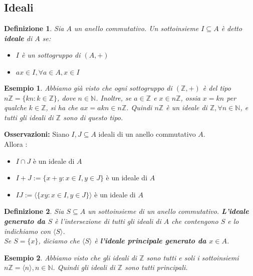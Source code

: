 \documentclass[a4paper,12pt]{article}
\theoremstyle{def}
\newtheorem*{definition}{Definizione}
\theoremstyle{prop}
\theoremstyle{esempio}
\newtheorem*{example}{Esempio}
\theoremstyle{dimostrazione}
\theoremstyle{teo}
\theoremstyle{osservazione}
\begin{document}
\subsection{Ideali}

\begin{definition}
    Sia \(A\) un anello commutativo. Un sottoinsieme \(I \subseteq A\) è detto \textbf{ideale} di \(A\) se:
    \
    \begin{itemize}
        \item \(I\) è un sottogruppo di \((A,+)\)
        \item \(ax \in I, \forall a \in A, x \in I\)
    \end{itemize}
\end{definition}

\begin{example}
    Abbiamo già visto che ogni sottogruppo di \((\mathbb{Z} , +)\) è del tipo \(n \mathbb{Z} = \{kn : k \in \mathbb{Z} \}\),
    dove \(n \in \mathbb{N} \). Inoltre, se \(a \in \mathbb{Z} \) e \(x \in n\mathbb{Z} \), ossia
    \(x=kn\) per qualche \(k \in \mathbb{Z} \), si ha che \(ax=akn \in n \mathbb{Z} \).
    Quindi \(n \mathbb{Z} \) è un ideale di \(\mathbb{Z}, \forall n \in \mathbb{N}  \), e tutti gli ideali di
    \(\mathbb{Z} \) sono di questo tipo.
\end{example}

\textbf{Osservazioni:} Siano \(I,J \subseteq A\) ideali di un anello commutativo \(A\).\\
Allora : \
\begin{itemize}
    \item \(I \cap J\) è un ideale di \(A\)
    \item \(I + J := \{x+y : x \in I, y \in J\}\) è un ideale di \(A\)
    \item \(IJ := \langle \{xy : x \in I, y \in J\} \rangle\) è un ideale di \(A\)
\end{itemize}

\begin{definition}
    Sia \(S \subseteq A\) un sottoinsieme di un anello commutativo. \textbf{L'ideale generato da \(S\)} è
    l'intersezione di tutti gli ideali di \(A\) che contengono \(S\) e lo indichiamo con \(\langle S \rangle\).\\
    Se \(S =\{x\}\), diciamo che \(\langle S \rangle\) è \textbf{l'ideale principale generato da \(x \in A\)}.
\end{definition}

\begin{example}
    Abbiamo visto che gli ideali di \(\mathbb{Z} \) sono tutti e soli i sottoinsiemi \(n \mathbb{Z}  = \langle n \rangle, n \in \mathbb{N} \).
    Quindi gli ideali di \(\mathbb{Z} \) sono tutti principali.
\end{example}
\end{document}
